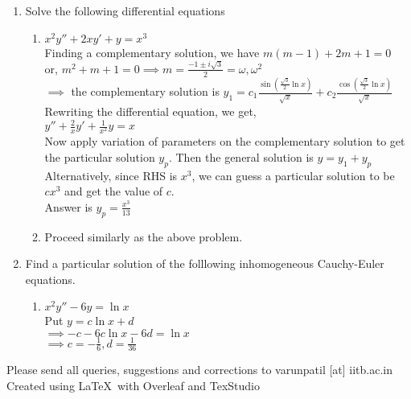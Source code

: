 \documentclass[a4paper]{article}
\begin{document}
\begin{enumerate}
\begin{enumerate}
	\end{enumerate}

	\item Solve the following differential equations
	\begin{enumerate}
		\item $x^2y''+2xy'+y=x^3$\\
		Finding a complementary solution, we have $m(m-1)+2m+1=0$\\
		or, $m^2+m+1=0 \implies m=\frac{-1\pm i\sqrt{3}}{2}=\omega, \omega^2$\\
		$\implies$ the complementary solution is $y_1=c_1\frac{\sin (\frac{\sqrt{3}}{2}\ln x)}{\sqrt{x}}+c_2\frac{\cos (\frac{\sqrt{3}}{2}\ln x)}{\sqrt{x}}$
		Rewriting the differential equation, we get,\\
		$y''+\frac{2}{x}y'+\frac{1}{x^2}y=x$\\
		Now apply variation of parameters on the complementary solution to get the particular solution $y_p$. Then the general solution is $y=y_1+y_p$\\
		Alternatively, since RHS is $x^3$, we can guess a particular solution to be $cx^3$ and get the value of $c$.\\
		Answer is $y_p=\frac{x^3}{13}$
	
		\item Proceed similarly as the above problem.
	\end{enumerate}

	\item Find a particular solution of the folllowing inhomogeneous Cauchy-Euler equations.
	\begin{enumerate}
		\item $x^2y''-6y=\ln x$\\
		Put $y=c\ln x + d$\\
		$\implies -c-6c\ln x -6d=\ln x$\\
		$\implies c=-\frac{1}{6}, d=\frac{1}{36}$
	\end{enumerate}
	
\end{enumerate}

\begin{center}
Please send all queries, suggestions and corrections to varunpatil [at] iitb.ac.in
\\Created using \LaTeX \ with Overleaf and TexStudio
\end{center}
\end{document}
